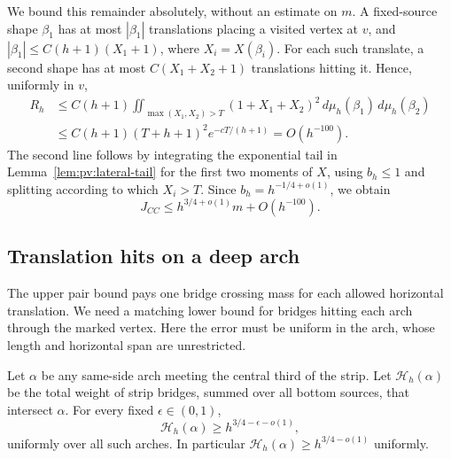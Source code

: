 We bound this remainder absolutely, without an estimate on $m$.
A fixed-source shape $\beta_1$ has at most $|\beta_1|$ translations
placing a visited vertex at $v$, and
$|\beta_1|\le C(h+1)(X_1+1)$, where $X_i=X(\beta_i)$.
For each such translate, a second shape has at most
$C(X_1+X_2+1)$ translations hitting it. Hence, uniformly in $v$,
\begin{align*}
 R_h&\le C(h+1)
 \iint_{\max(X_1,X_2)>T}(1+X_1+X_2)^2
 \,d\mu_h(\beta_1)\,d\mu_h(\beta_2)\\
 &\le C(h+1)(T+h+1)^2e^{-cT/(h+1)}=O(h^{-100}).
\end{align*}
The second line follows by integrating the exponential tail in
Lemma~\ref{lem:pv:lateral-tail} for the first two moments of $X$,
using $b_h\le1$ and splitting according to which $X_i>T$.
Since $b_h=h^{-1/4+o(1)}$, we obtain
\begin{equation}\label{eq:pv:bridge-pair-upper}
 J_{CC}\le h^{3/4+o(1)}m+O(h^{-100}).
\end{equation}

\subsection{Translation hits on a deep arch}

The upper pair bound pays one bridge crossing mass for each allowed
horizontal translation. We need a matching lower bound for bridges
hitting each arch through the marked vertex. Here the error must be
uniform in the arch, whose length and horizontal span are unrestricted.

\begin{lemma}\label{lem:pv:translation-hits}
Let $\alpha$ be any same-side arch meeting the central third of the
strip. Let $\mathcal H_h(\alpha)$ be the total weight of strip bridges,
summed over all bottom sources, that intersect $\alpha$. For every
fixed $\epsilon\in(0,1)$,
\[
 \mathcal H_h(\alpha)\ge h^{3/4-\epsilon-o(1)},
\]
uniformly over all such arches. In particular
$\mathcal H_h(\alpha)\ge h^{3/4-o(1)}$ uniformly.
\end{lemma}

